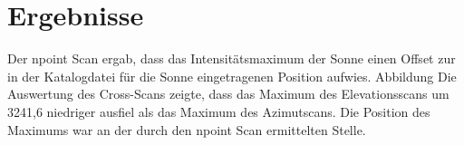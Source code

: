 \section{Ergebnisse}
Der npoint Scan ergab, dass das Intensitätsmaximum der Sonne einen Offset zur in der Katalogdatei für die Sonne eingetragenen Position aufwies. Abbildung %
Die Auswertung des Cross-Scans zeigte, dass das Maximum des Elevationsscans um 3241,6 niedriger ausfiel als das Maximum des Azimutscans. Die Position des Maximums war an der durch den npoint Scan ermittelten Stelle.